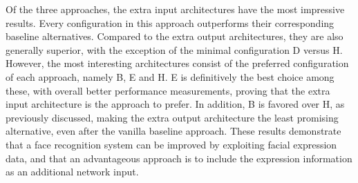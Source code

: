 \noindent Of the three approaches, the extra input architectures have the most impressive results. Every configuration in this approach outperforms their corresponding baseline alternatives. Compared to the extra output architectures, they are also generally superior, with the exception of the minimal configuration D versus H. However, the most interesting architectures consist of the preferred configuration of each approach, namely B, E and H. E is definitively the best choice among these, with overall better performance measurements, proving that the extra input architecture is the approach to prefer. In addition, B is favored over H, as previously discussed, making the extra output architecture the least promising alternative, even after the vanilla baseline approach. These results demonstrate that a face recognition system can be improved by exploiting facial expression data, and that an advantageous approach is to include the expression information as an additional network input.


\cleardoublepage